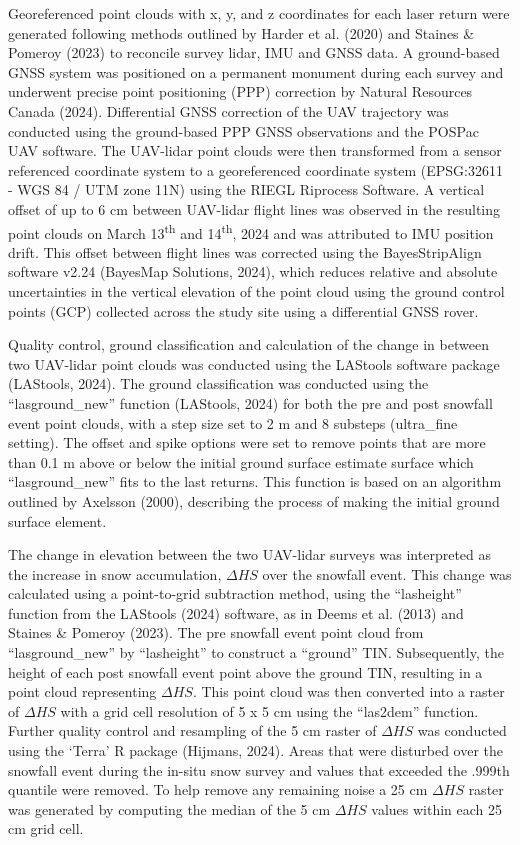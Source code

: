 \documentclass[
  letterpaper,
  DIV=11,
  numbers=noendperiod]{scrartcl}
\begin{document}
Georeferenced point clouds with x, y, and z coordinates for each laser
return were generated following methods outlined by Harder et al. (2020)
and Staines \& Pomeroy (2023) to reconcile survey lidar, IMU and GNSS
data. A ground-based GNSS system was positioned on a permanent monument
during each survey and underwent precise point positioning (PPP)
correction by Natural Resources Canada (2024). Differential GNSS
correction of the UAV trajectory was conducted using the ground-based
PPP GNSS observations and the POSPac UAV software. The UAV-lidar point
clouds were then transformed from a sensor referenced coordinate system
to a georeferenced coordinate system (EPSG:32611 - WGS 84 / UTM zone
11N) using the RIEGL Riprocess Software. A vertical offset of up to 6 cm
between UAV-lidar flight lines was observed in the resulting point
clouds on March 13\textsuperscript{th} and 14\textsuperscript{th}, 2024
and was attributed to IMU position drift. This offset between flight
lines was corrected using the BayesStripAlign software v2.24 (BayesMap
Solutions, 2024), which reduces relative and absolute uncertainties in
the vertical elevation of the point cloud using the ground control
points (GCP) collected across the study site using a differential GNSS
rover.

Quality control, ground classification and calculation of the change in
between two UAV-lidar point clouds was conducted using the LAStools
software package (LAStools, 2024). The ground classification was
conducted using the ``lasground\_new'' function (LAStools, 2024) for
both the pre and post snowfall event point clouds, with a step size set
to 2 m and 8 substeps (ultra\_fine setting). The offset and spike
options were set to remove points that are more than 0.1 m above or
below the initial ground surface estimate surface which
``lasground\_new'' fits to the last returns. This function is based on
an algorithm outlined by Axelsson (2000), describing the process of
making the initial ground surface element.

The change in elevation between the two UAV-lidar surveys was
interpreted as the increase in snow accumulation, \(\Delta HS\) over the
snowfall event. This change was calculated using a point-to-grid
subtraction method, using the ``lasheight'' function from the LAStools
(2024) software, as in Deems et al. (2013) and Staines \& Pomeroy
(2023). The pre snowfall event point cloud from ``lasground\_new'' by
``lasheight'' to construct a ``ground'' TIN. Subsequently, the height of
each post snowfall event point above the ground TIN, resulting in a
point cloud representing \(\Delta HS\). This point cloud was then
converted into a raster of \(\Delta HS\) with a grid cell resolution of
5 x 5 cm using the ``las2dem'' function. Further quality control and
resampling of the 5 cm raster of \(\Delta HS\) was conducted using the
`Terra' R package (Hijmans, 2024). Areas that were disturbed over the
snowfall event during the in-situ snow survey and values that exceeded
the .999th quantile were removed. To help remove any remaining noise a
25 cm \(\Delta HS\) raster was generated by computing the median of the
5 cm \(\Delta HS\) values within each 25 cm grid cell.
\end{document}
